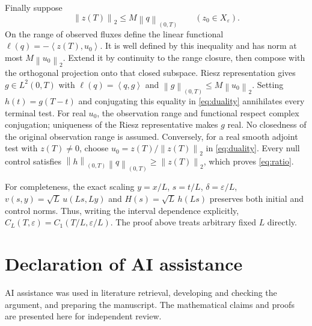 \documentclass[11pt]{article}
\numberwithin{equation}{section}
\newcommand{\eps}{\varepsilon}
\newcommand{\norm}[1]{\left\|#1\right\|}
\newcommand{\ip}[2]{\left\langle #1,#2\right\rangle}
\begin{document}
Finally suppose
\[
 \norm{z(T)}_2\le M\norm q_{(0,T)}\qquad(z_0\in X_\eps).
\]
On the range of observed fluxes define the linear functional
$\ell(q)=-\ip{z(T)}{u_0}$.
It is well defined by this inequality and has norm at most
$M\norm{u_0}_2$.
Extend it by continuity to the range closure, then compose with the
orthogonal projection onto that closed subspace.
Riesz representation gives $g\in L^2(0,T)$ with
$\ell(q)=\ip qg$ and $\norm g_{(0,T)}\le M\norm{u_0}_2$.
Setting $h(t)=g(T-t)$ and conjugating this equality in
\eqref{eq:duality} annihilates every terminal test.
For real $u_0$, the observation range and functional respect complex
conjugation; uniqueness of the Riesz representative makes $g$ real.
No closedness of the original observation range is assumed.
Conversely, for a real smooth adjoint test with $z(T)\ne0$, choose
$u_0=z(T)/\norm{z(T)}_2$ in \eqref{eq:duality}.
Every null control satisfies
$\norm h_{(0,T)}\norm q_{(0,T)}\ge\norm{z(T)}_2$,
which proves \eqref{eq:ratio}.

For completeness, the exact scaling
$y=x/L$, $s=t/L$, $\delta=\eps/L$,
$v(s,y)=\sqrt L\,u(Ls,Ly)$ and $H(s)=\sqrt L\,h(Ls)$
preserves both initial and control norms.
Thus, writing the interval dependence explicitly,
$C_L(T,\eps)=C_1(T/L,\eps/L)$.
The proof above treats arbitrary fixed $L$ directly.

\section*{Declaration of AI assistance}
AI assistance was used in literature retrieval, developing and checking
the argument, and preparing the manuscript. The mathematical claims
and proofs are presented here for independent review.
\end{document}
